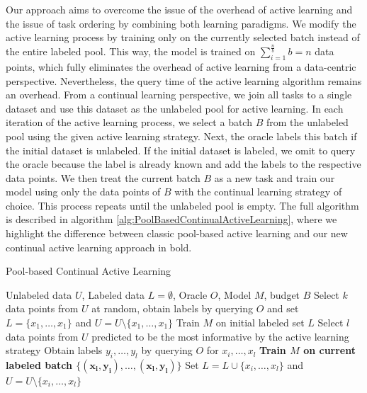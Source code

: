 Our approach aims to overcome the issue of the overhead of active learning and the issue of task ordering by combining both learning paradigms. We modify the active
learning process by training only on the currently selected batch instead of the entire labeled pool. This way, the model is trained on $\sum_{i=1}^{\frac{n}{b}} b = n$ 
data points, which fully eliminates the overhead of active learning from a data-centric perspective. Nevertheless, the query time of the active learning algorithm remains
an overhead. From a continual learning perspective, we join all tasks to a single dataset and use this dataset as the unlabeled pool for active learning. In each iteration
of the active learning process, we select a batch $B$ from the unlabeled pool using the given active learning strategy. Next, the oracle labels this batch if the initial
dataset is unlabeled. If the initial dataset is labeled, we omit to query the oracle because the label is already known and add the labels
to the respective data points. We then treat the current batch $B$ as a new task and train our model using only the data points of $B$ with the continual learning strategy of
choice. This process repeats until the unlabeled pool is empty. The full algorithm is described in algorithm \ref{alg:PoolBasedContinualActiveLearning}, where we highlight
the difference between classic pool-based active learning and our new continual active learning approach in bold. \par

\begin{algorithm}
    \caption{Pool-based Continual Active Learning} \label{alg:PoolBasedContinualActiveLearning}
    \begin{algorithmic}[1]
        \Require Unlabeled data $U$, Labeled data $L = \emptyset$, Oracle $O$, Model $M$, budget $B$
        \State Select $k$ data points from $U$ at random, obtain labels by querying $O$ and set $L=\{x_1,\ldots,x_1\}$
        and $U = U \setminus \{x_1,\ldots,x_1\}$ 
        \State Train $M$ on initial labeled set $L$
            \State Select $l$ data points from $U$ predicted to be the most informative by the active learning strategy
            \State Obtain labels $y_i,\ldots,y_l$ by querying $O$ for $x_i,\ldots,x_l$
            \State \textbf{Train $M$ on current labeled batch $\{\mathbf{(x_i,y_i),\ldots,(x_l,y_l)}\}$}
            \State Set $L= L \cup \{x_i,\ldots,x_l\}$ and $U = U \setminus \{x_i,\ldots,x_l\}$
        \EndWhile
    \end{algorithmic}
\end{algorithm}

